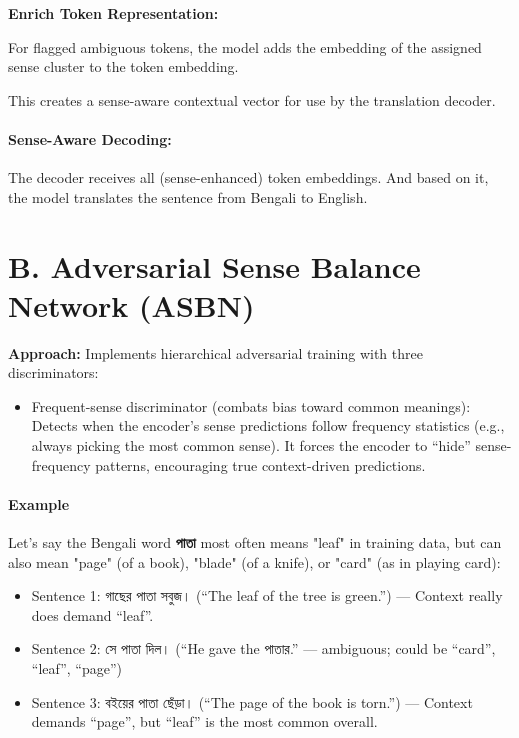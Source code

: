 \documentclass[a4paper,12pt]{article}
\begin{document}
\textbf{Enrich Token Representation:}

For flagged ambiguous tokens, the model adds the embedding of the assigned sense cluster to the token embedding.

This creates a sense-aware contextual vector for use by the translation decoder.

\paragraph{Sense-Aware Decoding:} The decoder receives all (sense-enhanced) token embeddings. And based on it, the model translates the sentence from Bengali to English.

\bigskip

\section*{B. Adversarial Sense Balance Network (ASBN)}

\textbf{Approach:} Implements hierarchical adversarial training with three discriminators:

\begin{itemize}
    \item Frequent-sense discriminator (combats bias toward common meanings): Detects when the encoder’s sense predictions follow frequency statistics (e.g., always picking the most common sense). It forces the encoder to “hide” sense-frequency patterns, encouraging true context-driven predictions.
\end{itemize}

\paragraph{Example}

Let’s say the Bengali word \textbf{\textbengali{পাতা}} most often means "leaf" in training data, but can also mean "page" (of a book), "blade" (of a knife), or "card" (as in playing card):

\begin{itemize}
    \item Sentence 1: \textbengali{গাছের পাতা সবুজ।} (“The leaf of the tree is green.”) — Context really does demand “leaf”.
    \item Sentence 2: \textbengali{সে পাতা দিল।} (“He gave the \textbengali{পাতার}.” — ambiguous; could be “card”, “leaf”, “page”)
    \item Sentence 3: \textbengali{বইয়ের পাতা ছেঁড়া।} (“The page of the book is torn.”) — Context demands “page”, but “leaf” is the most common overall.
\end{itemize}
\end{document}
